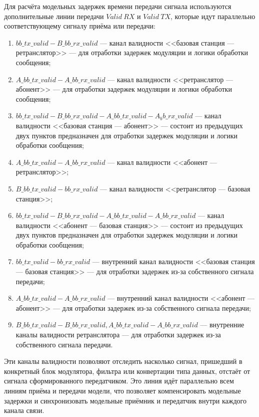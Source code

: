 \begin{onehalfspace}

Для расчёта модельных задержек времени передачи сигнала используются дополнительные линии передачи $Valid \ RX$ и $Valid \ TX$, которые идут параллельно соответствующему сигналу приёма или передачи:

\begin{enumerate} 	
	
	\item $bb\_tx\_valid - B\_bb\_rx\_valid$ — канал валидности <<базовая станция — ретранслятор>>  — для отработки задержек модуляции и логики обработки сообщения; 
	
	
	\item  $A\_bb\_tx\_valid - A\_bb\_rx\_valid$ — канал валидности <<ретранслятор — абонент>>  — для отработки задержек модуляции и логики обработки сообщения;
	
	\item  $bb\_tx\_valid - B\_bb\_rx\_valid - A\_bb\_tx\_valid - A_bb\_rx\_valid$ — канал валидности <<базовая станция — абонент>> — состоит из предыдущих двух пунктов предназначен для отработки задержек модуляции и логики обработки сообщения;
		
	\item  $A\_bb\_tx\_valid - A\_bb\_rx\_valid$ — канал валидности <<абонент — ретранслятор>>;
	
	\item  $B\_bb\_tx\_valid - bb\_rx\_valid$ — канал валидности <<ретранслятор — базовая станция>>;
	
	\item  $bb\_tx\_valid - B\_bb\_rx\_valid - A\_bb\_tx\_valid - A\_bb\_rx\_valid$ — канал валидности <<абонент — базовая станция>> —  состоит из предыдущих двух пунктов предназначен для отработки задержек модуляции и логики обработки сообщения;
	
	\item  $bb\_tx\_valid - bb\_rx\_valid$ — внутренний канал валидности <<базовая станция — базовая станция>> — для отработки задержек из-за собственного сигнала передачи;
	
	\item  $A\_bb\_tx\_valid - A\_bb\_rx\_valid$ — внутренний канал валидности <<абонент — абонент>>  — для отработки задержек из-за собственного сигнала передачи;
	
	\item  $B\_bb\_tx\_valid - B\_bb\_rx\_valid, A\_bb\_tx\_valid - A\_bb\_rx\_valid$ — внутренние каналы валидности ретранслятора — для отработки задержек из-за собственного сигнала передачи.



\end{enumerate}

Эти каналы валидности позволяют отследить насколько сигнал, пришедший в конкретный блок модулятора, фильтра или конвертации типа данных, отстаёт от сигнала сформированного передатчиком. Это линия идёт параллельно всем линиям приёма и передачи модели, что позволяет компенсировать модельные задержки и синхронизовать модельные приёмник и передатчик внутри каждого канала связи.
\end{onehalfspace}
